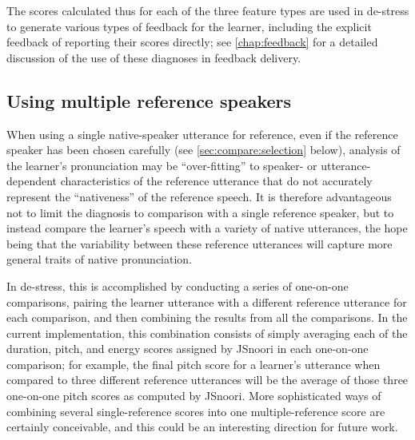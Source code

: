	



	\vspace{2em}
	
	The scores calculated thus for each of the three feature types are used in de-stress to generate various types of feedback for the learner, including the explicit feedback of reporting their scores directly; see \cref{chap:feedback} for a detailed discussion of the use of these diagnoses in feedback delivery.


	\subsection{Using multiple reference speakers}
	\label{sec:compare:multi}
	
	When using a single native-speaker utterance for reference, even if the reference speaker has been chosen carefully (see \cref{sec:compare:selection} below), analysis of the learner's pronunciation may be ``over-fitting'' to speaker- or utterance-dependent characteristics of the reference utterance that do not accurately represent the ``nativeness'' of the reference speech. It is therefore advantageous not to limit the diagnosis to comparison with a single reference speaker, but to instead compare the learner's speech with a variety of native utterances, the hope being that the variability between these reference utterances will capture more general traits of native pronunciation.
	
	In de-stress, this is accomplished by conducting a series of one-on-one comparisons, pairing the learner utterance with a different reference utterance for each comparison, and then combining the results from all the comparisons. 
	In the current implementation, this combination consists of simply averaging
	each of the duration, pitch, and energy scores assigned by JSnoori in each one-on-one comparison; for example, the final pitch score for a learner's utterance when compared to three different reference utterances will be the average of those three one-on-one pitch scores as computed by JSnoori. More sophisticated ways of combining several single-reference scores into one multiple-reference score are certainly conceivable, and this could be an interesting direction for future work. %
	

